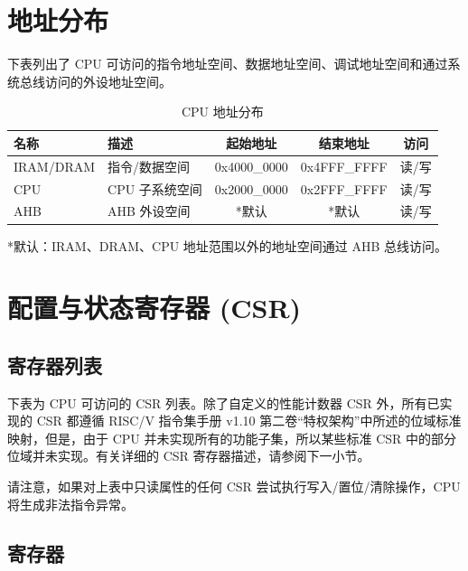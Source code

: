 \documentclass[main\_\_CN.tex]{subfiles}
\begin{document}
\section{地址分布}

下表列出了 CPU 可访问的指令地址空间、数据地址空间、调试地址空间和通过系统总线访问的外设地址空间。

\begin{longtable}{| l| l |c | c | c  |}
\caption{CPU 地址分布} \label{tab:riscvcpu-mem-blocks}
\\ \hline
\rowcolor{lightgray}
名称 & 描述   &  起始地址  &  结束地址  & 访问  \\ \hline
IRAM/DRAM\label{TBD1} & 指令/数据空间  &   0x4000\_0000  &  0x4FFF\_FFFF  &  读/写 \\ \hline
CPU \label{TBD4} & CPU 子系统空间  &      0x2000\_0000  &  0x2FFF\_FFFF  &  读/写 \\ \hline
AHB\label{TBD3} & AHB 外设空间 &      *默认  &  *默认  &  读/写 \\ \hline
\end{longtable}

*默认：IRAM、DRAM、CPU 地址范围以外的地址空间通过 AHB 总线访问。



\section{配置与状态寄存器 (CSR)}
\hypertarget{riscvcpu-cpu-reg-summ}{}
\subsection{寄存器列表}
\label{sec:riscvcpu-cpu-reg-summ}


下表为 CPU 可访问的 CSR 列表。除了自定义的性能计数器 CSR 外，所有已实现的 CSR 都遵循 RISC\-/V 指令集手册 v1.10 第二卷“特权架构”中所述的位域标准映射，但是，由于 CPU 并未实现所有的功能子集，所以某些标准 CSR 中的部分位域并未实现。有关详细的 CSR 寄存器描述，请参阅下一小节。



请注意，如果对上表中只读属性的任何 CSR 尝试执行写入/置位/清除操作，CPU 将生成非法指令异常。

\subsection{寄存器}
\end{document}

